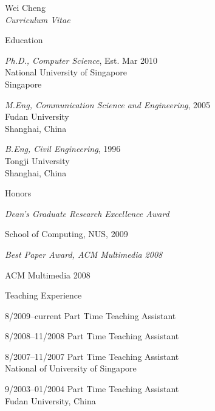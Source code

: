 \documentclass[10pt]{article}
\newenvironment{sublist}{%
	\begin{list}{}{%
		\setlength{\itemsep}{0em}\setlength{\parsep}{0em}%
		\setlength{\topsep}{0em}\setlength{\parskip}{0em}%
	}%
}%
{ \end{list} }
\begin{document}
\begin{cv}{Wei Cheng\\{\large \itshape Curriculum Vitae}}
\begin{cvlist}{Education}
	\item \emph{Ph.D., Computer Science}, Est. Mar 2010\\
	National University of Singapore\\
        Singapore
	\item \emph{M.Eng, Communication Science and Engineering}, 2005\\ 
	Fudan University\\
	Shanghai, China
	\item \emph{B.Eng, Civil Engineering}, 1996\\
	Tongji University\\
	Shanghai, China
\end{cvlist}

\begin{cvlist}{Honors}
\item
    \emph{Dean's Graduate Research Excellence Award}
	\begin{sublist}
	\item School of Computing, NUS, 2009
	\end{sublist}
\item
    \emph{Best Paper Award, ACM Multimedia 2008}
	\begin{sublist}
	\item ACM Multimedia 2008
	\end{sublist}
\end{cvlist}

\begin{cvlist}{Teaching Experience}
    \item[8/2009--current] Part Time Teaching Assistant
    \item[8/2008--11/2008] Part Time Teaching Assistant
	\item[8/2007--11/2007] Part Time Teaching Assistant\\
	National of University of Singapore 
    \item[9/2003--01/2004] Part Time Teaching Assistant\\
    Fudan University, China
\end{cvlist}


\end{cv}
\end{document}
